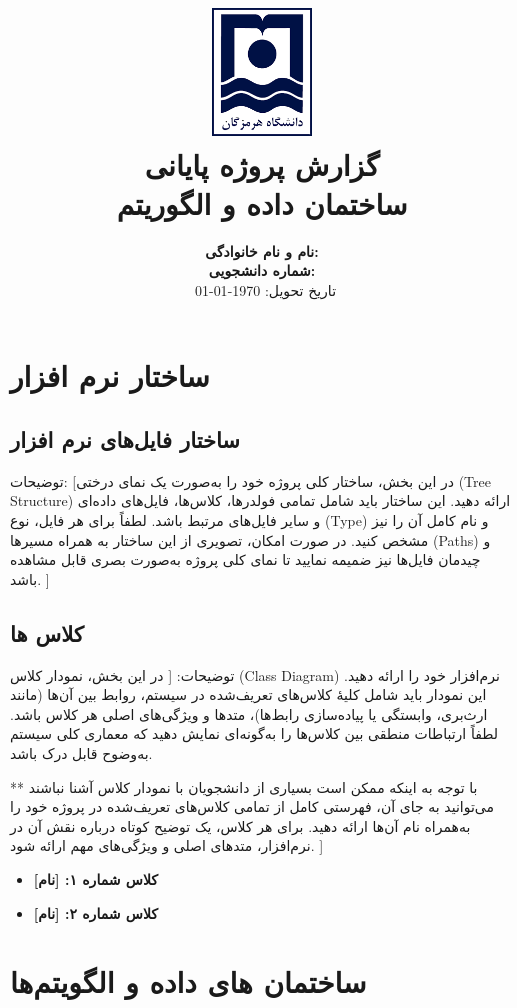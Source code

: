 \documentclass[12pt]{article}
\title{
	\vspace*{-2cm}
	\includegraphics[width=0.2\textwidth]{university-logo}\\
	\vspace{1cm}
	\textcolor{primary}{\bfseries  گزارش پروژه پایانی}\\
	\Huge ساختمان داده و الگوریتم
}
\author{
	\large
	\textbf{نام و نام خانوادگی:} \hrulefill \\
	\vspace{0.5cm}
	\textbf{شماره دانشجویی:} \hrulefill \\
	\vspace{1cm}
	\textcolor{primary}{\faCalendar\ تاریخ تحویل: \today}
}
\date{}
\begin{document}
	
	\maketitle
	\thispagestyle{empty}
	
	\newpage
	\renewcommand{\contentsname}{\textcolor{primary}{فهرست مطالب}}
	\tableofcontents
	\newpage
	
	
	\section{ساختار نرم افزار}
	\subsection{ساختار فایل‌های نرم افزار}
	توضیحات: [در این بخش، ساختار کلی پروژه خود را به‌صورت یک نمای درختی (Tree Structure) ارائه دهید. این ساختار باید شامل تمامی فولدرها، کلاس‌ها، فایل‌های داده‌ای و سایر فایل‌های مرتبط باشد. لطفاً برای هر فایل، نوع (Type) و نام کامل آن را نیز مشخص کنید. در صورت امکان، تصویری از این ساختار به همراه مسیرها (Paths) و چیدمان فایل‌ها نیز ضمیمه نمایید تا نمای کلی پروژه به‌صورت بصری قابل مشاهده باشد.  ]
	\subsection{کلاس ها}
	توضیحات: [
در این بخش، نمودار کلاس (Class Diagram) نرم‌افزار خود را ارائه دهید. این نمودار باید شامل کلیهٔ کلاس‌های تعریف‌شده در سیستم، روابط بین آن‌ها (مانند ارث‌بری، وابستگی یا پیاده‌سازی رابط‌ها)، متدها و ویژگی‌های اصلی هر کلاس باشد. لطفاً ارتباطات منطقی بین کلاس‌ها را به‌گونه‌ای نمایش دهید که معماری کلی سیستم به‌وضوح قابل درک باشد.

** با توجه به اینکه ممکن است بسیاری از دانشجویان با نمودار کلاس آشنا نباشند می‌توانید به جای آن، فهرستی کامل از تمامی کلاس‌های تعریف‌شده در پروژه خود را به‌همراه نام آن‌ها ارائه دهید. برای هر کلاس، یک توضیح کوتاه درباره نقش آن در نرم‌افزار، متدهای اصلی و ویژگی‌های مهم ارائه شود. ]
	\begin{itemize}[noitemsep]
		\item \textbf{کلاس شماره ۱: [نام]}\\
		\lipsum[8]
		\item \textbf{کلاس شماره ۲: [نام]}\\
		\lipsum[8]
		
	\end{itemize}
	\newpage
	\section{ساختمان های داده و الگویتم‌ها}
\end{document}
